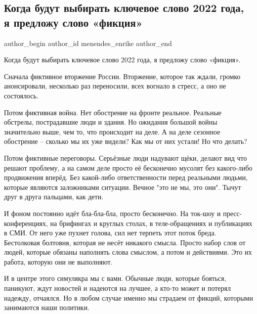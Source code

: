  
 
 
 
 
 
\subsection{Когда будут выбирать ключевое слово 2022 года, я предложу слово «фикция»}
\label{sec:19_02_2022.fb.menendes_enrike.1.fikcia}
 
\ifcmt
 author_begin
   author_id menendes_enrike
 author_end
\fi

Когда будут выбирать ключевое слово 2022 года, я предложу слово «фикция».

Сначала фиктивное вторжение России. Вторжение, которое так ждали, громко
анонсировали, несколько раз переносили, всех вогнало в стресс, а оно не
состоялось.

Потом фиктивная война. Нет обострение на фронте реальное. Реальные обстрелы,
пострадавшие люди и здания. Но ожидания большой войны значительно выше, чем то,
что происходит на деле. А на деле сезонное обострение – сколько мы их уже
видели? Как мы от них устали! Но что делать?

Потом фиктивные переговоры. Серьёзные люди надувают щёки, делают вид что решают
проблему, а на самом деле просто её бесконечно мусолят без какого-либо
продвижения вперёд. Без какой-либо ответственности перед реальными людьми,
которые являются заложниками ситуации. Вечное "это не мы, это они". Тычут друг
в друга пальцами, как дети.

И фоном постоянно идёт бла-бла-бла, просто бесконечно. На ток-шоу и
пресс-конференциях, на брифингах и круглых столах, в теле-обращениях и
публикациях в СМИ. От него уже пухнет голова, сил нет терпеть этот поток бреда.
Бестолковая болтовня, которая не несёт никакого смысла. Просто набор слов от
людей, которые обязаны наполнять слова смыслом, а потом и действиями. Это их
работа, которую они не выполняют.

И в центре этого симулякра мы с вами. Обычные люди, которые бояться, паникуют,
ждут новостей и надеются на лучшее, а кто-то может и потерял надежду, отчаялся.
Но в любом случае именно мы страдаем от фикций, которыми занимаются наши
политики.
